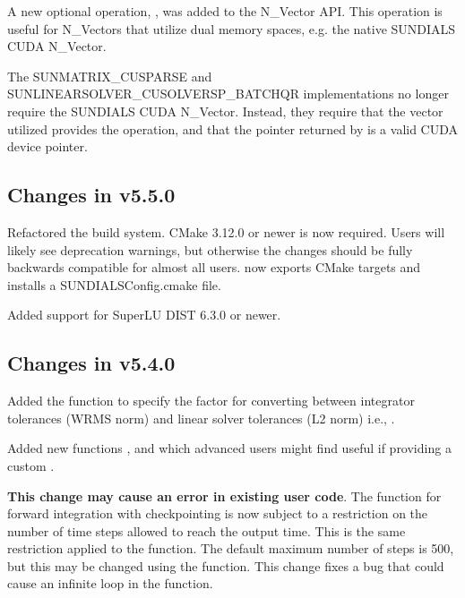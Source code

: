 A new optional operation, , was added to the N\_Vector
API. This operation is useful for N\_Vectors that utilize dual memory spaces,
e.g. the native SUNDIALS CUDA N\_Vector.

The SUNMATRIX\_CUSPARSE and SUNLINEARSOLVER\_CUSOLVERSP\_BATCHQR implementations
no longer require the SUNDIALS CUDA N\_Vector. Instead, they require that the vector
utilized provides the  operation, and that the pointer
returned by  is a valid CUDA device pointer.

\subsection*{Changes in v5.5.0}

Refactored the {\sundials} build system. CMake 3.12.0 or newer is now required.
Users will likely see deprecation warnings, but otherwise the changes
should be fully backwards compatible for almost all users. {\sundials}
now exports CMake targets and installs a SUNDIALSConfig.cmake file.

Added support for SuperLU DIST 6.3.0 or newer.


\subsection*{Changes in v5.4.0}

Added the function  to specify the factor for
converting between integrator tolerances (WRMS norm) and linear solver
tolerances (L2 norm) i.e., .

Added new functions , and 
which advanced users might find useful if providing a custom
.

\textbf{This change may cause an error in existing user code}.
The  function for forward integration with checkpointing is now
subject to a restriction on the number of time steps allowed to reach the output
time. This is the same restriction applied to the  function. The
default maximum number of steps is 500, but this may be changed using the
 function. This change fixes a bug that could cause an
infinite loop in the  function.

